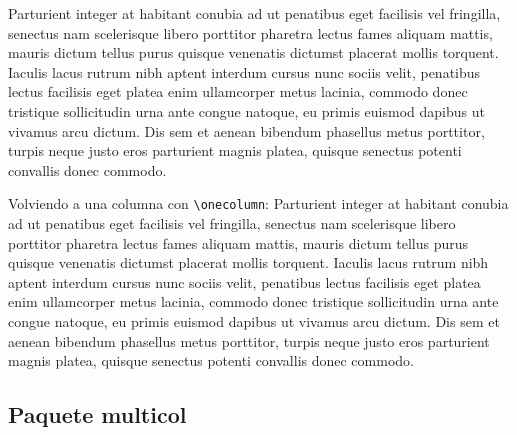 \documentclass{article}
\begin{document}
	Parturient integer at habitant conubia ad ut penatibus eget facilisis vel fringilla, senectus nam scelerisque libero porttitor pharetra lectus fames aliquam mattis, mauris dictum tellus purus quisque venenatis dictumst placerat mollis torquent. Iaculis lacus rutrum nibh aptent interdum cursus nunc sociis velit, penatibus lectus facilisis eget platea enim ullamcorper metus lacinia, commodo donec tristique sollicitudin urna ante congue natoque, eu primis euismod dapibus ut vivamus arcu dictum. Dis sem et aenean bibendum phasellus metus porttitor, turpis neque justo eros parturient magnis platea, quisque senectus potenti convallis donec commodo.
	
	Volviendo a una columna con \verb|\onecolumn|: \onecolumn 	
	Parturient integer at habitant conubia ad ut penatibus eget facilisis vel fringilla, senectus nam scelerisque libero porttitor pharetra lectus fames aliquam mattis, mauris dictum tellus purus quisque venenatis dictumst placerat mollis torquent. Iaculis lacus rutrum nibh aptent interdum cursus nunc sociis velit, penatibus lectus facilisis eget platea enim ullamcorper metus lacinia, commodo donec tristique sollicitudin urna ante congue natoque, eu primis euismod dapibus ut vivamus arcu dictum. Dis sem et aenean bibendum phasellus metus porttitor, turpis neque justo eros parturient magnis platea, quisque senectus potenti convallis donec commodo.
	
	\subsection{Paquete \ttfamily multicol}
	
\end{document}
